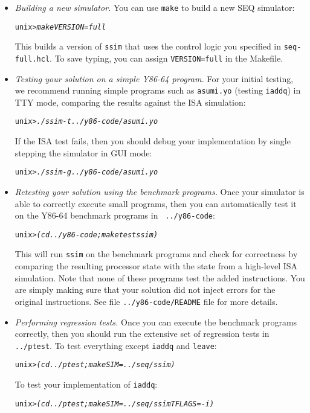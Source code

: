 \documentclass[11pt]{article}
\newenvironment{tty}%
{\small\begin{alltt}}%
{\end{alltt}}
\newenvironment{codefrag}%
{\small\begin{alltt}}%
{\end{alltt}%
}
\begin{document}
\begin{itemize}
\item {\em Building a new simulator.} 
You can use \texttt{make} to build a new SEQ simulator:
\begin{codefrag}
unix> {\em make VERSION=full}
\end{codefrag}
This builds a version of \texttt{ssim} that uses the control logic you
specified in \texttt{seq-full.hcl}.  To save typing, you can assign
\texttt{VERSION=full} in the Makefile. 

\item {\em Testing your solution on a simple Y86-64 program.}
For your initial testing, we recommend running simple programs such
as \texttt{asumi.yo} (testing \texttt{iaddq}) in TTY mode,
comparing the results against the ISA simulation:
\begin{tty}
unix> {\em ./ssim -t ../y86-code/asumi.yo}
\end{tty}
If the ISA test fails, then you should debug your implementation by
single stepping the simulator in GUI mode:
\begin{tty}
unix> {\em ./ssim -g ../y86-code/asumi.yo}
\end{tty}

\item {\em Retesting your solution using the benchmark programs.}
Once your simulator is able to correctly execute small programs, then
you can automatically test it on the Y86-64 benchmark programs in {\tt
../y86-code}:
\begin{tty}
unix> {\em (cd ../y86-code; make testssim)}
\end{tty}
This will run {\tt ssim} on the benchmark programs and check for
correctness by comparing the resulting processor state with the state
from a high-level ISA simulation.
Note that none of these programs test the added instructions.
You are simply making sure that your solution did not inject errors
for the original instructions.
See file
\texttt{../y86-code/README} file for more details.

\item {\em Performing regression tests.}
Once you can execute the benchmark programs correctly, then you should
run the extensive set of regression tests in {\tt ../ptest}.  To test
everything except {\tt iaddq} and {\tt leave}:
\begin{tty}
unix> {\em (cd ../ptest; make SIM=../seq/ssim)}
\end{tty}
To test your implementation of {\tt iaddq}:
\begin{tty}
unix> {\em (cd ../ptest; make SIM=../seq/ssim TFLAGS=-i)}
\end{tty}
\end{itemize}
\end{document}
